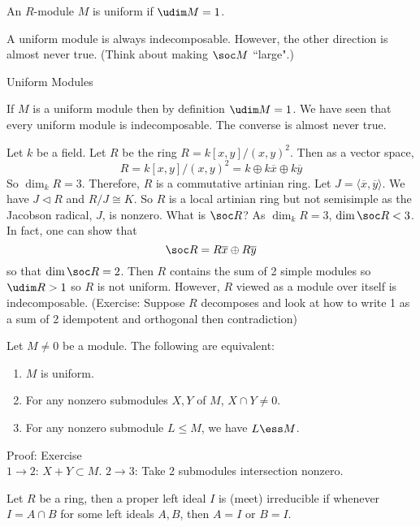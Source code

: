\begin{dfn}[Uniform]
An $R$-module $M$ is uniform if $\udim M=1$.
\end{dfn}

\begin{rem}
A uniform module is always indecomposable. However, the other direction is almost never true. (Think about making $\soc M$ ``large".) 
\end{rem}

Uniform Modules

If $M$ is a uniform module then by definition $\udim M=1$. We have seen that every uniform module is indecomposable. The converse is almost never true. 

\begin{ex}
Let $k$ be a field. Let $R$ be the ring $R=k[x,y]/(x,y)^2$. Then as a vector space,
\[
R=k[x,y]/(x,y)^2=k \oplus k\overline{x} \oplus k \overline{y}
\]
So $\dim_k R=3$. Therefore, $R$ is a commutative artinian ring. Let $J=\langle \overline{x},\overline{y} \rangle$. We have $J \lhd R$ and $R/J \cong K$. So $R$ is a local artinian ring but not semisimple as the Jacobson radical, $J$, is nonzero. What is $\soc R$? As $\dim_k R=3$, $\dim \soc R<3$. In fact, one can show that 
\[
\soc R=R \overline{x} \oplus R \overline{y}
\]
so that $\dim \soc R=2$. Then $R$ contains the sum of 2 simple modules so $\udim R>1$ so $R$ is not uniform. However, $R$ viewed as a module over itself is indecomposable. (Exercise: Suppose $R$ decomposes and look at how to write 1 as a sum of 2 idempotent and orthogonal then contradiction) 
\end{ex}

\begin{lem}
Let $M \neq 0$ be a module. The following are equivalent: 
\begin{enumerate}[1.]
\item $M$ is uniform.
\item For any nonzero submodules $X,Y$ of $M$, $X \cap Y \neq 0$.
\item For any nonzero submodule $L \leq M$, we have $L \ess M$. 
\end{enumerate}
\end{lem}

Proof: Exercise \\
$1 \rightarrow 2$: $X+Y \subset M$. $2 \rightarrow 3$: Take 2 submodules intersection nonzero. 

\begin{dfn}
Let $R$ be a ring, then a proper left ideal $I$ is (meet) irreducible if whenever $I=A \cap B$ for some left ideals $A,B$, then $A=I$ or $B=I$.
\end{dfn}

